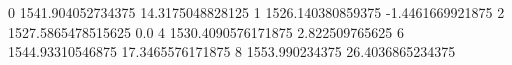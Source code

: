 0 1541.904052734375 14.3175048828125
1 1526.140380859375 -1.4461669921875
2 1527.5865478515625 0.0
4 1530.4090576171875 2.822509765625
6 1544.93310546875 17.3465576171875
8 1553.990234375 26.4036865234375
